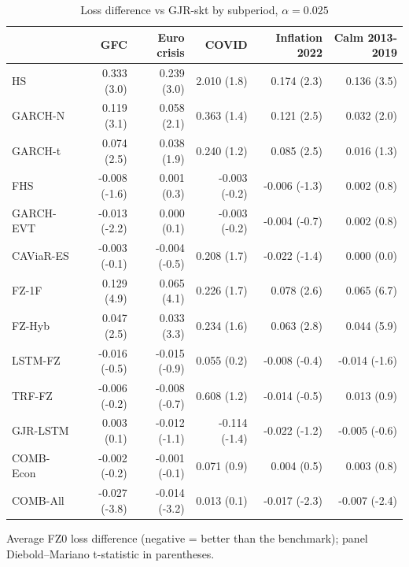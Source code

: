 \begin{table}[htbp]
\centering
\footnotesize
\caption{Loss difference vs GJR-skt by subperiod, $\alpha=0.025$}
\label{tab:sub}
\begin{tabular}{lrrrrr}
\toprule
 & GFC & Euro crisis & COVID & Inflation 2022 & Calm 2013-2019 \\
\midrule
HS & 0.333 (3.0) & 0.239 (3.0) & 2.010 (1.8) & 0.174 (2.3) & 0.136 (3.5) \\
GARCH-N & 0.119 (3.1) & 0.058 (2.1) & 0.363 (1.4) & 0.121 (2.5) & 0.032 (2.0) \\
GARCH-t & 0.074 (2.5) & 0.038 (1.9) & 0.240 (1.2) & 0.085 (2.5) & 0.016 (1.3) \\
FHS & -0.008 (-1.6) & 0.001 (0.3) & -0.003 (-0.2) & -0.006 (-1.3) & 0.002 (0.8) \\
GARCH-EVT & -0.013 (-2.2) & 0.000 (0.1) & -0.003 (-0.2) & -0.004 (-0.7) & 0.002 (0.8) \\
CAViaR-ES & -0.003 (-0.1) & -0.004 (-0.5) & 0.208 (1.7) & -0.022 (-1.4) & 0.000 (0.0) \\
FZ-1F & 0.129 (4.9) & 0.065 (4.1) & 0.226 (1.7) & 0.078 (2.6) & 0.065 (6.7) \\
FZ-Hyb & 0.047 (2.5) & 0.033 (3.3) & 0.234 (1.6) & 0.063 (2.8) & 0.044 (5.9) \\
LSTM-FZ & -0.016 (-0.5) & -0.015 (-0.9) & 0.055 (0.2) & -0.008 (-0.4) & -0.014 (-1.6) \\
TRF-FZ & -0.006 (-0.2) & -0.008 (-0.7) & 0.608 (1.2) & -0.014 (-0.5) & 0.013 (0.9) \\
GJR-LSTM & 0.003 (0.1) & -0.012 (-1.1) & -0.114 (-1.4) & -0.022 (-1.2) & -0.005 (-0.6) \\
COMB-Econ & -0.002 (-0.2) & -0.001 (-0.1) & 0.071 (0.9) & 0.004 (0.5) & 0.003 (0.8) \\
COMB-All & -0.027 (-3.8) & -0.014 (-3.2) & 0.013 (0.1) & -0.017 (-2.3) & -0.007 (-2.4) \\
\bottomrule
\end{tabular}
\par\smallskip\parbox{\linewidth}{\scriptsize Average FZ0 loss difference (negative = better than the benchmark); panel Diebold--Mariano t-statistic in parentheses.}
\end{table}